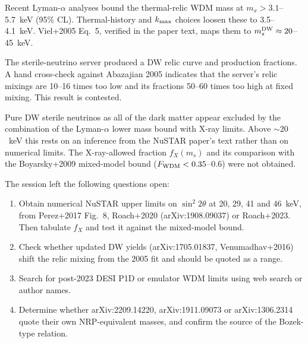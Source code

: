 \documentclass[11pt,a4paper]{article}
\begin{document}
Recent Lyman-$\alpha$ analyses bound the thermal-relic WDM mass at $m_x>3.1$--5.7~keV (95\% CL). Thermal-history and $k_{\rm max}$ choices loosen these to 3.5--4.1~keV. Viel+2005 Eq.~5, verified in the paper text, maps them to $m_s^{\rm DW}\approx20$--45~keV.

The sterile-neutrino server produced a DW relic curve and production fractions. A hand cross-check against Abazajian 2005 indicates that the server's relic mixings are 10--16 times too low and its fractions 50--60 times too high at fixed mixing. This result is contested.

Pure DW sterile neutrinos as all of the dark matter appear excluded by the combination of the Lyman-$\alpha$ lower mass bound with X-ray limits. Above $\sim20$~keV this rests on an inference from the NuSTAR paper's text rather than on numerical limits. The X-ray-allowed fraction $f_X(m_s)$ and its comparison with the Boyarsky+2009 mixed-model bound ($F_{\rm WDM}<0.35$--0.6) were not obtained.

The session left the following questions open:
\begin{enumerate}
\item Obtain numerical NuSTAR upper limits on $\sin^2 2\theta$ at 20, 29, 41 and 46~keV, from Perez+2017 Fig.~8, Roach+2020 (arXiv:1908.09037) or Roach+2023. Then tabulate $f_X$ and test it against the mixed-model bound.
\item Check whether updated DW yields (arXiv:1705.01837, Venumadhav+2016) shift the relic mixing from the 2005 fit and should be quoted as a range.
\item Search for post-2023 DESI P1D or emulator WDM limits using web search or author names.
\item Determine whether arXiv:2209.14220, arXiv:1911.09073 or arXiv:1306.2314 quote their own NRP-equivalent masses, and confirm the source of the Bozek-type relation.
\end{enumerate}
\end{document}
